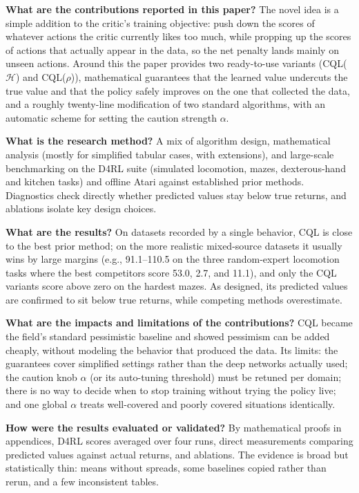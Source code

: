 \documentclass[11pt]{article}
\newcommand{\q}[2]{\item \textbf{#1} #2}
\begin{document}
\begin{qna}
\q{What are the contributions reported in this paper?}
The novel idea is a simple addition to the critic's training objective: push down the scores of whatever actions the critic currently likes too much, while propping up the scores of actions that actually appear in the data, so the net penalty lands mainly on unseen actions. Around this the paper provides two ready-to-use variants (CQL($\mathcal{H}$) and CQL($\rho$)), mathematical guarantees that the learned value undercuts the true value and that the policy safely improves on the one that collected the data, and a roughly twenty-line modification of two standard algorithms, with an automatic scheme for setting the caution strength $\alpha$.

\q{What is the research method?}
A mix of algorithm design, mathematical analysis (mostly for simplified tabular cases, with extensions), and large-scale benchmarking on the D4RL suite (simulated locomotion, mazes, dexterous-hand and kitchen tasks) and offline Atari against established prior methods. Diagnostics check directly whether predicted values stay below true returns, and ablations isolate key design choices.

\q{What are the results?}
On datasets recorded by a single behavior, CQL is close to the best prior method; on the more realistic mixed-source datasets it usually wins by large margins (e.g., 91.1--110.5 on the three random-expert locomotion tasks where the best competitors score 53.0, 2.7, and 11.1), and only the CQL variants score above zero on the hardest mazes. As designed, its predicted values are confirmed to sit below true returns, while competing methods overestimate.

\q{What are the impacts and limitations of the contributions?}
CQL became the field's standard pessimistic baseline and showed pessimism can be added cheaply, without modeling the behavior that produced the data. Its limits: the guarantees cover simplified settings rather than the deep networks actually used; the caution knob $\alpha$ (or its auto-tuning threshold) must be retuned per domain; there is no way to decide when to stop training without trying the policy live; and one global $\alpha$ treats well-covered and poorly covered situations identically.

\q{How were the results evaluated or validated?}
By mathematical proofs in appendices, D4RL scores averaged over four runs, direct measurements comparing predicted values against actual returns, and ablations. The evidence is broad but statistically thin: means without spreads, some baselines copied rather than rerun, and a few inconsistent tables.


\end{qna}
\end{document}
